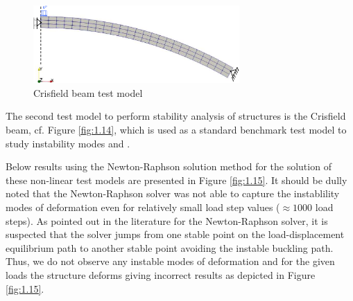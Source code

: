 \documentclass[11pt,a4paper,final]{article}
\begin{document}
\begin{figure}[ht!]
\centering
\includegraphics[width=0.7\textwidth]{crisfield_beam.pdf}
\caption{Crisfield beam test model}
\label{fig:1.14}
\end{figure}

The second test model to perform stability analysis of structures is the Crisfield beam, cf. Figure \eqref{fig:1.14}, which is used as a standard benchmark test model to study instability modes \cite[see][page 170]{Wriggers2008} and \cite{Hrinda2010}. \par 

Below results using the Newton-Raphson solution method for the solution of these non-linear test models are presented in Figure \eqref{fig:1.15}. It should be dully noted that the Newton-Raphson solver was not able to capture the instablility modes of deformation even for relatively small load step values ($\approx 1000$ load steps). As pointed out in the literature for the Newton-Raphson solver, it is suspected that the solver jumps from one stable point on the load-displacement equilibrium path to another stable point avoiding the instable buckling path. Thus, we do not observe any instable modes of deformation and for the given loads the structure deforms giving incorrect results as depicted in Figure \eqref{fig:1.15}.\par
\end{document}
